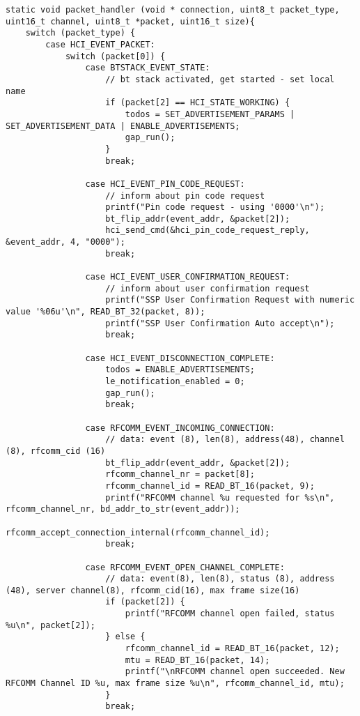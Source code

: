 \begin{lstlisting}[float, caption= SPP\&LE client - packet handler., label=code:spp_le_gap_run]
static void packet_handler (void * connection, uint8_t packet_type, uint16_t channel, uint8_t *packet, uint16_t size){
    switch (packet_type) {
        case HCI_EVENT_PACKET:
            switch (packet[0]) {
                case BTSTACK_EVENT_STATE:
                    // bt stack activated, get started - set local name
                    if (packet[2] == HCI_STATE_WORKING) {
                        todos = SET_ADVERTISEMENT_PARAMS | SET_ADVERTISEMENT_DATA | ENABLE_ADVERTISEMENTS;
                        gap_run();
                    }
                    break;
                                    
                case HCI_EVENT_PIN_CODE_REQUEST:
                    // inform about pin code request
                    printf("Pin code request - using '0000'\n");
                    bt_flip_addr(event_addr, &packet[2]);
                    hci_send_cmd(&hci_pin_code_request_reply, &event_addr, 4, "0000");
                    break;

                case HCI_EVENT_USER_CONFIRMATION_REQUEST:
                    // inform about user confirmation request
                    printf("SSP User Confirmation Request with numeric value '%06u'\n", READ_BT_32(packet, 8));
                    printf("SSP User Confirmation Auto accept\n");
                    break;

                case HCI_EVENT_DISCONNECTION_COMPLETE:
                    todos = ENABLE_ADVERTISEMENTS;
                    le_notification_enabled = 0;
                    gap_run();
                    break;

                case RFCOMM_EVENT_INCOMING_CONNECTION:
                    // data: event (8), len(8), address(48), channel (8), rfcomm_cid (16)
                    bt_flip_addr(event_addr, &packet[2]); 
                    rfcomm_channel_nr = packet[8];
                    rfcomm_channel_id = READ_BT_16(packet, 9);
                    printf("RFCOMM channel %u requested for %s\n", rfcomm_channel_nr, bd_addr_to_str(event_addr));
                    rfcomm_accept_connection_internal(rfcomm_channel_id);
                    break;
                    
                case RFCOMM_EVENT_OPEN_CHANNEL_COMPLETE:
                    // data: event(8), len(8), status (8), address (48), server channel(8), rfcomm_cid(16), max frame size(16)
                    if (packet[2]) {
                        printf("RFCOMM channel open failed, status %u\n", packet[2]);
                    } else {
                        rfcomm_channel_id = READ_BT_16(packet, 12);
                        mtu = READ_BT_16(packet, 14);
                        printf("\nRFCOMM channel open succeeded. New RFCOMM Channel ID %u, max frame size %u\n", rfcomm_channel_id, mtu);
                    }
                    break;
                    

\end{lstlisting}
